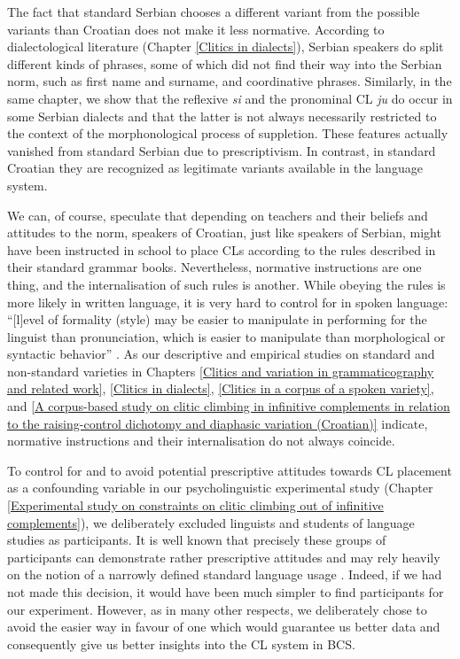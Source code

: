 The fact that standard Serbian chooses a different variant from the possible variants than Croatian does not make it less normative. According to dialectological literature (Chapter \ref{Clitics in dialects}), Serbian speakers do split different kinds of phrases, some of which did not find their way into the Serbian norm, such as first name and surname, and coordinative phrases. Similarly, in the same chapter, we show that the reflexive \textit{si} and the pronominal CL \textit{ju} do occur in some Serbian dialects and that the latter is not always necessarily restricted to the context of the morphonological process of suppletion. These features actually vanished from standard Serbian due to prescriptivism. In contrast, in standard Croatian they are recognized as legitimate variants available in the language system.

We can, of course, speculate that depending on teachers and their beliefs and attitudes to the norm, speakers of Croatian, just like speakers of Serbian, might have been instructed in school to place CLs according to the rules described in their standard grammar books. Nevertheless, normative instructions are one thing, and the internalisation of such rules is another. While obeying the rules is more likely in written language, it is very hard to control for in spoken language: ``[l]evel of formality (style) may be easier to manipulate in performing for the linguist than pronunciation, which is easier to manipulate than morphological or syntactic behavior'' \citep[26]{Stefanowitsch20}. As our descriptive and empirical studies on standard and non-standard varieties in Chapters \ref{Clitics and variation in grammaticography and related work}, \ref{Clitics in dialects}, \ref{Clitics in a corpus of a spoken variety}, and \ref{A corpus-based study on clitic climbing in infinitive complements in relation to the raising-control dichotomy and diaphasic variation (Croatian)} indicate, normative instructions and their internalisation do not always coincide.

\begin{sloppypar}To control for and to avoid potential prescriptive attitudes towards CL placement as a confounding variable in our psycholinguistic experimental study (Chapter \ref{Experimental study on constraints on clitic climbing out of infinitive complements}), we deliberately excluded linguists and students of language studies as participants. It is well known that precisely these groups of participants can demonstrate rather prescriptive attitudes and may rely heavily on the notion of a narrowly defined standard language usage \citep[cf.][]{KrugSell13}. Indeed, if we had not made this decision, it would have been much simpler to find participants for our experiment. However, as in many other respects, we deliberately chose to avoid the easier way in favour of one which would guarantee us better data and consequently give us better insights into the CL system in BCS.\end{sloppypar}



